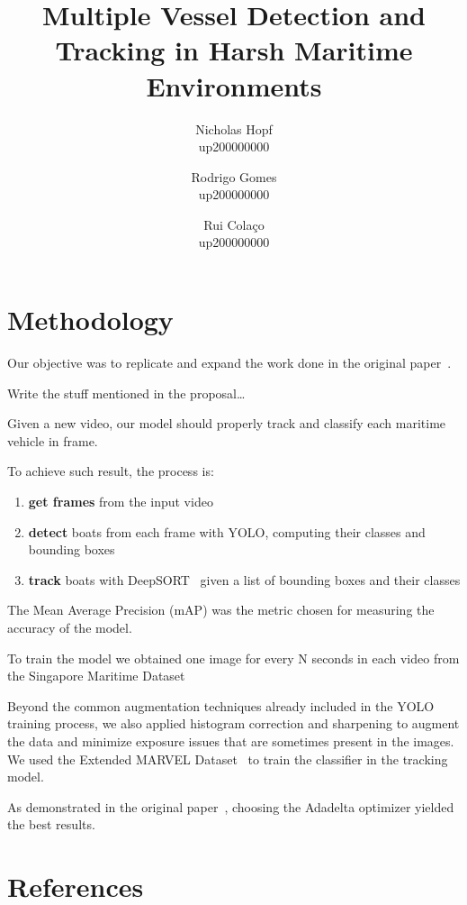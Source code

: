 \documentclass[a4paper,12pt,oneside,twocolumn]{article}
\title{
\textbf{Multiple Vessel Detection and Tracking in Harsh Maritime Environments}
}
\author{
    Nicholas Hopf\\
    up200000000
    \and
    Rodrigo Gomes\\
    up200000000
    \and
    Rui Colaço\\
    up200000000
}
\date{\vspace{-3ex}}
\begin{document}
\maketitle

\section{Methodology}\label{sec:methodology}
Our objective was to replicate and expand the work done in the original paper~\cite{MVDTHME}.

\hfill\newline
Write the stuff mentioned in the proposal\ldots %
\hfill\newline

Given a new video, our model should properly track and classify each maritime vehicle in frame.

To achieve such result, the process is:
\begin{enumerate}
    \item \textbf{get frames} from the input video
    \item \textbf{detect} boats from each frame with YOLO, computing their classes and bounding boxes
    \item \textbf{track} boats with DeepSORT~\cite{DEEPSORT} given a list of bounding boxes and their classes
\end{enumerate}

The Mean Average Precision (mAP) was the metric chosen for measuring the accuracy of the model.

To train the model we obtained one image for every N seconds in each video from the Singapore Maritime Dataset~\cite{SINGAPORE}

Beyond the common augmentation techniques already included in the YOLO training process, we also applied histogram correction and sharpening to augment the data and minimize exposure issues that are sometimes present in the images.
We used the Extended MARVEL Dataset~\cite{MARVEL} to train the classifier in the tracking model.

As demonstrated in the original paper~\cite{MVDTHME}, choosing the Adadelta optimizer yielded the best results.


\section{References}\label{sec:references}
\printbibliography
\end{document}
